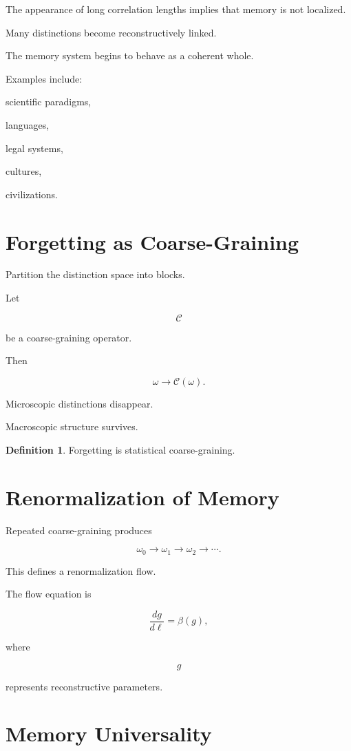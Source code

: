 \documentclass[12pt,oneside]{book}
\theoremstyle{plain} \newtheorem{theorem}{Theorem}[chapter] \newtheorem{lemma}[theorem]{Lemma} \newtheorem{proposition}[theorem]{Proposition} \newtheorem{corollary}[theorem]{Corollary}
\theoremstyle{definition} \newtheorem{definition}[theorem]{Definition} \newtheorem{axiom}[theorem]{Axiom} \newtheorem{construction}[theorem]{Construction}
\theoremstyle{remark} \newtheorem{remark}[theorem]{Remark} \newtheorem{example}[theorem]{Example}
\begin{document}
The appearance of long correlation lengths implies that memory is not localized.

Many distinctions become reconstructively linked.

The memory system begins to behave as a coherent whole.

Examples include:

scientific paradigms,

languages,

legal systems,

cultures,

civilizations.

\section{Forgetting as Coarse-Graining}

Partition the distinction space into blocks.

Let

\[
\mathcal C
\]

be a coarse-graining operator.

Then

\[
\omega
\rightarrow
\mathcal C(\omega).
\]

Microscopic distinctions disappear.

Macroscopic structure survives.

\begin{definition}

Forgetting is statistical coarse-graining.

\end{definition}

\section{Renormalization of Memory}

Repeated coarse-graining produces

\[
\omega_0
\rightarrow
\omega_1
\rightarrow
\omega_2
\rightarrow
\cdots.
\]

This defines a renormalization flow.

The flow equation is

\[
\frac{dg}{d\ell}
=
\beta(g),
\]

where

\[
g
\]

represents reconstructive parameters.

\section{Memory Universality}
\end{document}
